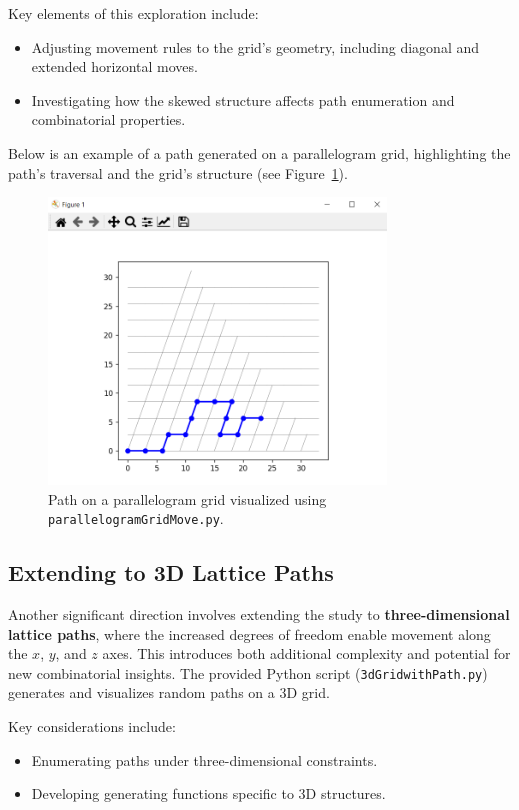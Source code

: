 \documentclass{article}
\begin{document}
Key elements of this exploration include:
\begin{itemize}
    \item Adjusting movement rules to the grid's geometry, including diagonal and extended horizontal moves.
    \item Investigating how the skewed structure affects path enumeration and combinatorial properties.
\end{itemize}

Below is an example of a path generated on a parallelogram grid, highlighting the path's traversal and the grid's structure (see Figure~\ref{fig:parallelogram-path}).

\begin{figure}[H]
    \centering
    \includegraphics[width=0.8\textwidth]{images/parallelogram.png}
    \caption{Path on a parallelogram grid visualized using \texttt{parallelogramGridMove.py}.}
    \label{fig:parallelogram-path}
\end{figure}



\subsection{Extending to 3D Lattice Paths}
Another significant direction involves extending the study to \textbf{three-dimensional lattice paths}, where the increased degrees of freedom enable movement along the $x$, $y$, and $z$ axes. This introduces both additional complexity and potential for new combinatorial insights. The provided Python script (\texttt{3dGridwithPath.py}) generates and visualizes random paths on a 3D grid.

Key considerations include:
\begin{itemize}
    \item Enumerating paths under three-dimensional constraints.
    \item Developing generating functions specific to 3D structures.
\end{itemize}
\end{document}
